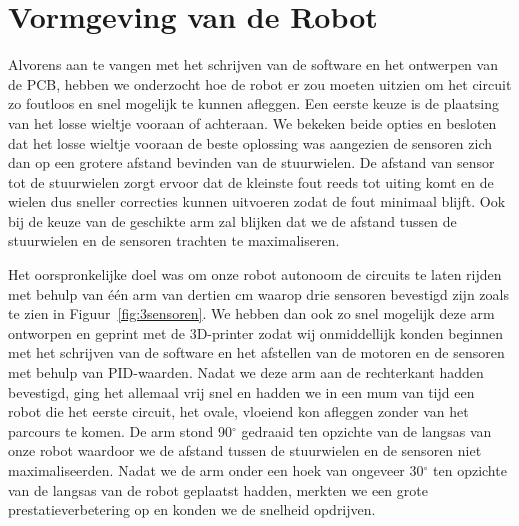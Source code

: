  
\chapter{Vormgeving van de Robot}
 




Alvorens aan te vangen met het schrijven van de software en het ontwerpen van de PCB, hebben we onderzocht hoe de robot er zou moeten uitzien om het circuit zo foutloos en snel mogelijk te kunnen afleggen. Een eerste keuze is de plaatsing van het losse wieltje vooraan of achteraan. We bekeken beide opties en besloten dat het losse wieltje vooraan de beste oplossing was aangezien de sensoren zich dan op een grotere afstand bevinden van de stuurwielen. De afstand van sensor tot de stuurwielen zorgt ervoor dat de kleinste fout reeds tot uiting komt en de wielen dus sneller correcties kunnen uitvoeren zodat de fout minimaal blijft. Ook bij de keuze van de geschikte arm zal blijken dat we de afstand tussen de stuurwielen en de sensoren trachten te maximaliseren.

Het oorspronkelijke doel was om onze robot autonoom de circuits te laten rijden met behulp van \'e\'en arm van dertien cm waarop drie sensoren bevestigd zijn zoals te zien in Figuur~\ref{fig:3sensoren}. We hebben dan ook zo snel mogelijk deze arm ontworpen en geprint met de 3D-printer zodat wij onmiddellijk konden beginnen met het schrijven van de software en het afstellen van de motoren en de sensoren met behulp van PID-waarden. Nadat we deze arm aan de rechterkant hadden bevestigd, ging het allemaal vrij snel en hadden we in een mum van tijd een robot die het eerste circuit, het ovale, vloeiend kon afleggen zonder van het parcours te komen. De arm stond 90$^\circ$ gedraaid ten opzichte van de langsas van onze robot waardoor we de afstand tussen de stuurwielen en de sensoren niet maximaliseerden. Nadat we de arm onder een hoek van ongeveer 30$^\circ$ ten opzichte van de langsas van de robot geplaatst hadden, merkten we een grote prestatieverbetering op en konden we de snelheid opdrijven.



